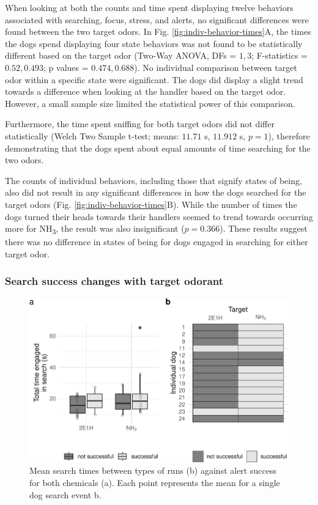 \documentclass[
]{article}
\begin{document}
When looking at both the counts and time spent displaying twelve behaviors associated with searching, focus, stress, and alerts, no significant differences were found between the two target odors. In Fig. \ref{fig:indiv-behavior-times}A, the times the dogs spend displaying four state behaviors was not found to be statistically different based on the target odor (Two-Way ANOVA, DFs = \(1, 3\); F-statistics = \(0.52, 0.493\); p values = \(0.474, 0.688\)). No individual comparison between target odor within a specific state were significant. The dogs did display a slight trend towards a difference when looking at the handler based on the target odor. However, a small sample size limited the statistical power of this comparison.

Furthermore, the time spent sniffing for both target odors did not differ statistically (Welch Two Sample t-test; means: \(11.71\) s, \(11.912\) s, \(p = 1\)), therefore demonstrating that the dogs spent about equal amounts of time searching for the two odors.

The counts of individual behaviors, including those that signify states of being, also did not result in any significant differences in how the dogs searched for the target odors (Fig. \ref{fig:indiv-behavior-times}B). While the number of times the dogs turned their heads towards their handlers seemed to trend towards occurring more for NH\textsubscript{3}, the result was also insignificant (\(p = 0.366\)). These results suggest there was no difference in states of being for dogs engaged in searching for either target odor.

\hypertarget{search-success-changes-with-target-odorant}{%
\subsubsection{Search success changes with target odorant}\label{search-success-changes-with-target-odorant}}

\begin{figure}
\centering
\includegraphics{main-manuscript_files/figure-latex/search-times-1.pdf}
\caption{\label{fig:search-times}Mean search times between types of runs (b) against alert success for both chemicals (a). Each point represents the mean for a single dog search event b.}
\end{figure}
\end{document}
